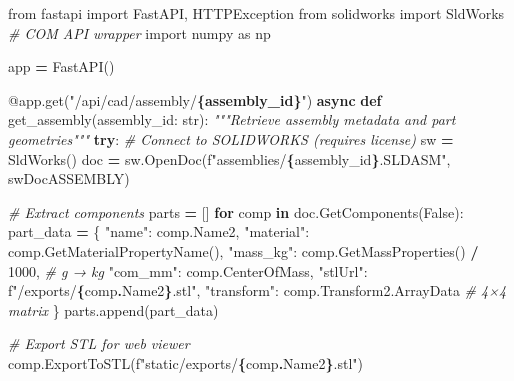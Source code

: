 \documentclass[
]{article}
\newenvironment{Shaded}{\begin{snugshade}}{\end{snugshade}}
\newcommand{\AttributeTok}[1]{\textcolor[rgb]{0.13,0.29,0.53}{#1}}
\newcommand{\BuiltInTok}[1]{#1}
\newcommand{\CommentTok}[1]{\textcolor[rgb]{0.56,0.35,0.01}{\textit{#1}}}
\newcommand{\ControlFlowTok}[1]{\textcolor[rgb]{0.13,0.29,0.53}{\textbf{#1}}}
\newcommand{\DecValTok}[1]{\textcolor[rgb]{0.00,0.00,0.81}{#1}}
\newcommand{\ImportTok}[1]{#1}
\newcommand{\KeywordTok}[1]{\textcolor[rgb]{0.13,0.29,0.53}{\textbf{#1}}}
\newcommand{\NormalTok}[1]{#1}
\newcommand{\OperatorTok}[1]{\textcolor[rgb]{0.81,0.36,0.00}{\textbf{#1}}}
\newcommand{\SpecialCharTok}[1]{\textcolor[rgb]{0.81,0.36,0.00}{\textbf{#1}}}
\newcommand{\SpecialStringTok}[1]{\textcolor[rgb]{0.31,0.60,0.02}{#1}}
\newcommand{\StringTok}[1]{\textcolor[rgb]{0.31,0.60,0.02}{#1}}
\newcommand{\VariableTok}[1]{\textcolor[rgb]{0.00,0.00,0.00}{#1}}
\begin{document}
\begin{Shaded}
\begin{Highlighting}[]
\ImportTok{from}\NormalTok{ fastapi }\ImportTok{import}\NormalTok{ FastAPI, HTTPException}
\ImportTok{from}\NormalTok{ solidworks }\ImportTok{import}\NormalTok{ SldWorks  }\CommentTok{\# COM API wrapper}
\ImportTok{import}\NormalTok{ numpy }\ImportTok{as}\NormalTok{ np}

\NormalTok{app }\OperatorTok{=}\NormalTok{ FastAPI()}

\AttributeTok{@app.get}\NormalTok{(}\StringTok{"/api/cad/assembly/}\SpecialCharTok{\{assembly\_id\}}\StringTok{"}\NormalTok{)}
\ControlFlowTok{async} \KeywordTok{def}\NormalTok{ get\_assembly(assembly\_id: }\BuiltInTok{str}\NormalTok{):}
    \CommentTok{"""Retrieve assembly metadata and part geometries"""}
    \ControlFlowTok{try}\NormalTok{:}
        \CommentTok{\# Connect to SOLIDWORKS (requires license)}
\NormalTok{        sw }\OperatorTok{=}\NormalTok{ SldWorks()}
\NormalTok{        doc }\OperatorTok{=}\NormalTok{ sw.OpenDoc(}\SpecialStringTok{f"assemblies/}\SpecialCharTok{\{}\NormalTok{assembly\_id}\SpecialCharTok{\}}\SpecialStringTok{.SLDASM"}\NormalTok{, swDocASSEMBLY)}

        \CommentTok{\# Extract components}
\NormalTok{        parts }\OperatorTok{=}\NormalTok{ []}
        \ControlFlowTok{for}\NormalTok{ comp }\KeywordTok{in}\NormalTok{ doc.GetComponents(}\VariableTok{False}\NormalTok{):}
\NormalTok{            part\_data }\OperatorTok{=}\NormalTok{ \{}
                \StringTok{"name"}\NormalTok{: comp.Name2,}
                \StringTok{"material"}\NormalTok{: comp.GetMaterialPropertyName(),}
                \StringTok{"mass\_kg"}\NormalTok{: comp.GetMassProperties() }\OperatorTok{/} \DecValTok{1000}\NormalTok{,  }\CommentTok{\# g → kg}
                \StringTok{"com\_mm"}\NormalTok{: comp.CenterOfMass,}
                \StringTok{"stlUrl"}\NormalTok{: }\SpecialStringTok{f"/exports/}\SpecialCharTok{\{}\NormalTok{comp}\SpecialCharTok{.}\NormalTok{Name2}\SpecialCharTok{\}}\SpecialStringTok{.stl"}\NormalTok{,}
                \StringTok{"transform"}\NormalTok{: comp.Transform2.ArrayData  }\CommentTok{\# 4×4 matrix}
\NormalTok{            \}}
\NormalTok{            parts.append(part\_data)}

            \CommentTok{\# Export STL for web viewer}
\NormalTok{            comp.ExportToSTL(}\SpecialStringTok{f"static/exports/}\SpecialCharTok{\{}\NormalTok{comp}\SpecialCharTok{.}\NormalTok{Name2}\SpecialCharTok{\}}\SpecialStringTok{.stl"}\NormalTok{)}


\end{Highlighting}
\end{Shaded}
\end{document}
